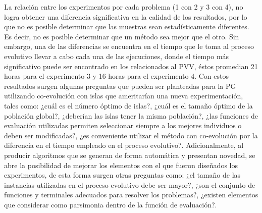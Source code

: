 La relación entre los experimentos por cada problema (1 con 2 y 3 con 4), no logra obtener una diferencia significativa en la calidad de los resultados, por lo que no es posible determinar que las muestras sean estadísticamente diferentes. Es decir, no es posible determinar que un método sea mejor que el otro. Sin embargo, una de las diferencias se encuentra en el tiempo que le toma al proceso evolutivo llevar a cabo cada una de las ejecuciones, donde el tiempo más significativo puede ser encontrado en los relacionados al PVV, éstos promedian 21 horas para el experimento 3 y 16 horas para el experimento 4. Con estos resultados surgen algunas preguntas que pueden ser planteadas para la PG utilizando co-evolución con islas que ameritarían una nueva experimentación, tales como: ¿cuál es el número óptimo de islas?, ¿cuál es el tamaño óptimo de la población global?, ¿deberían las islas tener la misma población?, ¿las funciones de evaluación utilizadas permiten seleccionar siempre a los mejores individuos o deben ser modificadas?, ¿es conveniente utilizar el método con co-evolución por la diferencia en el tiempo empleado en el proceso evolutivo?. Adicionalmente, al producir algoritmos que se generan de forma automática y presentan novedad, se abre la posibilidad de mejorar los elementos con el que fueron diseñados los experimentos, de esta forma surgen otras preguntas como: ¿el tamaño de las instancias utilizadas en el proceso evolutivo debe ser mayor?, ¿son el conjunto de funciones y terminales adecuados para resolver los problemas?, ¿existen elementos que considerar como parsimonia dentro de la función de evaluación?.
